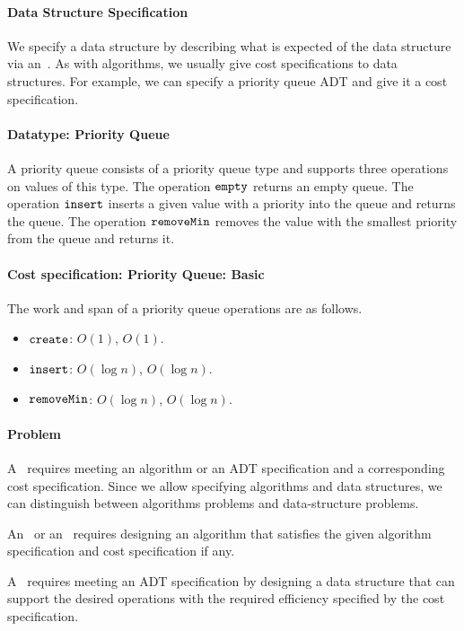 \paragraph{Data Structure Specification}
We specify a data structure by describing what is expected of the data
structure via an~.
%
As with algorithms, we usually give cost specifications to data
structures.
%
For example, we can specify a priority queue ADT and give it a cost
specification. 
%

\paragraph{Datatype: Priority Queue}
A priority queue consists of a priority queue type and supports three
operations on values of this type.  The operation $\texttt{empty}$ returns
an empty queue.  The operation $\texttt{insert}$ inserts a given value with
a priority into the queue and returns the queue.  The operation
$\texttt{removeMin}$ removes the value with the smallest priority from the
queue and returns it.

\paragraph{Cost specification: Priority Queue: Basic}
The work and span of a priority queue operations are as follows.
\begin{itemize}
\item $\texttt{create}$: $O(1)$, $O(1)$.
\item $\texttt{insert}$: $O(\log{n})$, $O(\log{n})$.
\item $\texttt{removeMin}$: $O(\log{n})$, $O(\log{n})$.
\end{itemize}

\paragraph{Problem}
A~ requires meeting an algorithm or an ADT specification
and a corresponding cost specification.
%
Since we allow specifying algorithms and data structures, we can
distinguish between algorithms problems and data-structure problems.
%

An~ or an~
requires designing an algorithm that satisfies the given algorithm
specification and cost specification if any.
%

A~ requires meeting an ADT
specification by designing a data structure that can
support the desired operations with the required efficiency specified
by the cost specification.
%

